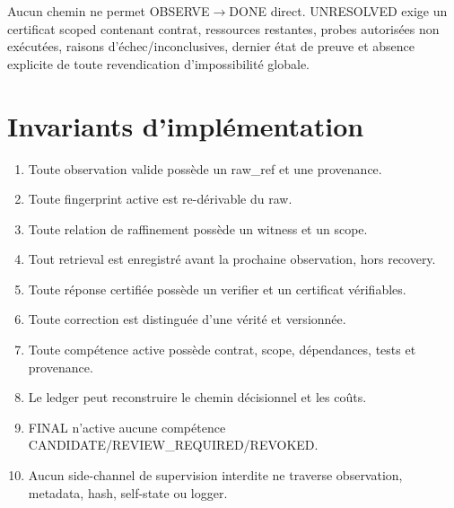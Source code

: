 \documentclass[11pt,a4paper]{report}
\begin{document}
Aucun chemin ne permet OBSERVE$\to$DONE direct. UNRESOLVED exige un certificat scoped contenant contrat, ressources restantes, probes autorisées non exécutées, raisons d'échec/inconclusives, dernier état de preuve et absence explicite de toute revendication d'impossibilité globale.

\chapter{Invariants d'implémentation}
\begin{enumerate}
\item Toute observation valide possède un raw\_ref et une provenance.
\item Toute fingerprint active est re-dérivable du raw.
\item Toute relation de raffinement possède un witness et un scope.
\item Tout retrieval est enregistré avant la prochaine observation, hors recovery.
\item Toute réponse certifiée possède un verifier et un certificat vérifiables.
\item Toute correction est distinguée d'une vérité et versionnée.
\item Toute compétence active possède contrat, scope, dépendances, tests et provenance.
\item Le ledger peut reconstruire le chemin décisionnel et les coûts.
\item FINAL n'active aucune compétence CANDIDATE/REVIEW\_REQUIRED/REVOKED.
\item Aucun side-channel de supervision interdite ne traverse observation, metadata, hash, self-state ou logger.
\end{enumerate}
\end{document}
